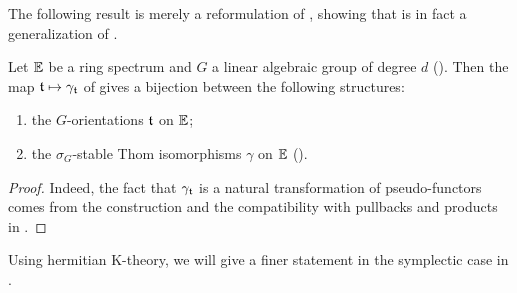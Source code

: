 The following result is merely a reformulation of ,
showing that  is in fact a generalization of 
.
\begin{prop}\label{prop:stable_G-orientations}
Let $\mathbb E$ be a ring spectrum and $G$ a linear algebraic group of degree $d$ ().
Then the map $\mathfrak{t} \mapsto \gamma_{\mathfrak{t}}$ of  gives a bijection between the following structures:
\begin{enumerate}
\item the $G$-orientations $\mathfrak{t}$ on $\mathbb E$;
\item the $\sigma_G$-stable Thom isomorphisms $\gamma$ on $\mathbb E$ ().
\end{enumerate}
\end{prop}
\begin{proof}
Indeed, the fact that $\gamma_{\mathfrak{t}}$ is a natural transformation of pseudo-functors comes from the construction
and the compatibility with pullbacks and products in . 
\end{proof}

\begin{rem}
Using hermitian K-theory, we will give a finer statement in the symplectic case in .
\end{rem}


